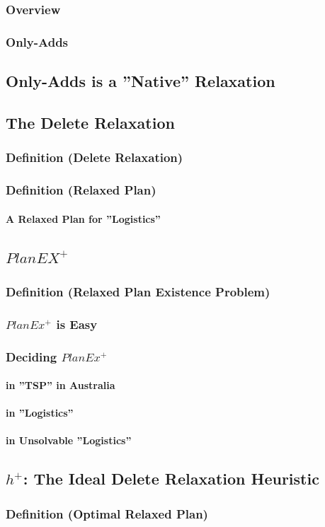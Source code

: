 \documentclass[conference, a4paper]{styles/acmsiggraph}
\newcommand\subsubsubsection{\paragraph}
\begin{document}
        \subsubsection{Overview}
        \subsubsection{Only-Adds}
    \subsection{Only-Adds is a ''Native'' Relaxation}
    \subsection{The Delete Relaxation}
        \subsubsection{Definition (Delete Relaxation)}
        \subsubsection{Definition (Relaxed Plan)}
            \subsubsubsection{A Relaxed Plan for ''Logistics''}
    \subsection{$PlanEX^+$}
        \subsubsection{Definition (Relaxed Plan Existence Problem)}
        \subsubsection{$PlanEx^+$ is Easy}
        \subsubsection{Deciding $PlanEx^+$}
            \subsubsubsection{in ''TSP'' in Australia}
            \subsubsubsection{in ''Logistics''}
            \subsubsubsection{in Unsolvable ''Logistics''}
    \subsection{$h^+$: The Ideal Delete Relaxation Heuristic}
        \subsubsection{Definition (Optimal Relaxed Plan)}
\end{document}
